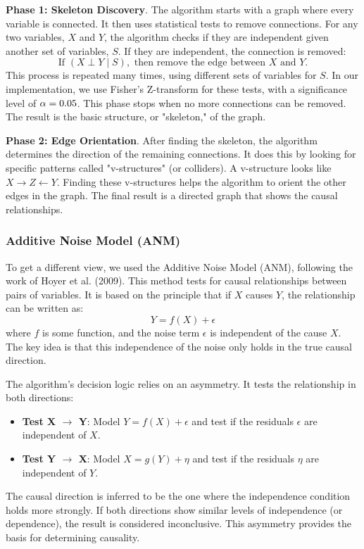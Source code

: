 \textbf{Phase 1: Skeleton Discovery}. The algorithm starts with a graph where every variable is connected. It then uses statistical tests to remove connections. For any two variables, $X$ and $Y$, the algorithm checks if they are independent given another set of variables, $S$. If they are independent, the connection is removed:
\[
\text{If } (X \perp Y \mid S), \text{ then remove the edge between } X \text{ and } Y.
\]
This process is repeated many times, using different sets of variables for $S$. In our implementation, we use Fisher's Z-transform for these tests, with a significance level of $\alpha = 0.05$. This phase stops when no more connections can be removed. The result is the basic structure, or "skeleton," of the graph.

\textbf{Phase 2: Edge Orientation}. After finding the skeleton, the algorithm determines the direction of the remaining connections. It does this by looking for specific patterns called "v-structures" (or colliders). A v-structure looks like $X \rightarrow Z \leftarrow Y$. Finding these v-structures helps the algorithm to orient the other edges in the graph. The final result is a directed graph that shows the causal relationships.

\subsubsection{Additive Noise Model (ANM)}
To get a different view, we used the Additive Noise Model (ANM), following the work of Hoyer et al. (2009)\cite{Hoyer09}. This method tests for causal relationships between pairs of variables. It is based on the principle that if $X$ causes $Y$, the relationship can be written as:
$$Y = f(X) + \epsilon$$
where $f$ is some function, and the noise term $\epsilon$ is independent of the cause $X$. The key idea is that this independence of the noise only holds in the true causal direction.

The algorithm's decision logic relies on an asymmetry. It tests the relationship in both directions:
\begin{itemize}
    \itemsep0em 
    \item \textbf{Test X $\rightarrow$ Y}: Model $Y = f(X) + \epsilon$ and test if the residuals $\epsilon$ are independent of $X$.
    \item \textbf{Test Y $\rightarrow$ X}: Model $X = g(Y) + \eta$ and test if the residuals $\eta$ are independent of $Y$.
\end{itemize}
The causal direction is inferred to be the one where the independence condition holds more strongly. If both directions show similar levels of independence (or dependence), the result is considered inconclusive. This asymmetry provides the basis for determining causality.

